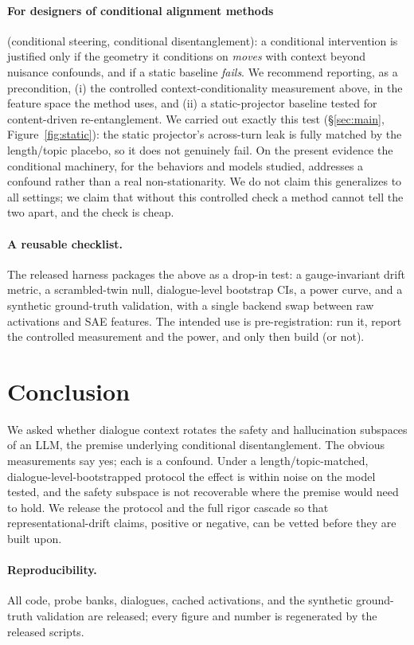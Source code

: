 \documentclass{article}
\begin{document}
\paragraph{For designers of conditional alignment methods} (conditional steering, conditional
disentanglement): a conditional intervention is justified only if the geometry it conditions on
\emph{moves} with context beyond nuisance confounds, and if a static baseline \emph{fails}. We
recommend reporting, as a precondition, (i) the controlled context-conditionality measurement
above, in the feature space the method uses, and (ii) a static-projector baseline tested for
content-driven re-entanglement. We carried out exactly this test (\S\ref{sec:main},
Figure~\ref{fig:static}): the static projector's across-turn leak is fully matched by the
length/topic placebo, so it does not genuinely fail. On the present evidence the conditional
machinery, for the behaviors and models studied, addresses a confound rather than a real
non-stationarity. We do not claim this generalizes to all settings; we claim that without this
controlled check a method cannot tell the two apart, and the check is cheap.

\paragraph{A reusable checklist.} The released harness packages the above as a drop-in test:
a gauge-invariant drift metric, a scrambled-twin null, dialogue-level bootstrap CIs, a power
curve, and a synthetic ground-truth validation, with a single backend swap between raw
activations and SAE features. The intended use is pre-registration: run it, report the
controlled measurement and the power, and only then build (or not).

\section{Conclusion}

We asked whether dialogue context rotates the safety and hallucination subspaces of an LLM,
the premise underlying conditional disentanglement. The obvious measurements say yes; each
is a confound. Under a length/topic-matched, dialogue-level-bootstrapped protocol the
effect is within noise on the model tested, and the safety subspace is not recoverable
where the premise would need to hold. We release the protocol and the full rigor cascade so
that representational-drift claims, positive or negative, can be vetted before they are
built upon.

\paragraph{Reproducibility.} All code, probe banks, dialogues, cached activations, and the
synthetic ground-truth validation are released; every figure and number is regenerated by
the released scripts.





\end{document}
